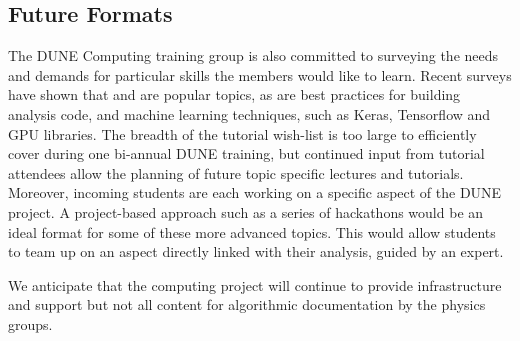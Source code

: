 \documentclass[../main-v1.tex]{subfiles}
\begin{document}
\subsection{Future Formats}
The DUNE Computing training group is also committed to surveying the needs and %
demands for particular %
skills the members would like to learn. Recent surveys have shown that  and  are popular topics, as are %
best practices for building analysis code, %
and machine learning techniques, such as Keras, Tensorflow and GPU libraries.  The breadth of the tutorial wish-list is too large to efficiently cover during one bi-annual DUNE training, but continued input from tutorial attendees allow the planning of future topic specific lectures and tutorials. Moreover, incoming students are each working 
on a specific aspect of the DUNE project. A 
 project-based approach such as a series of hackathons would be an ideal format for some of these more advanced topics. This would allow students to team up on an aspect 
 directly linked with their analysis, guided by an expert.

We anticipate that the computing project will continue to  provide infrastructure and support but not all content for algorithmic documentation by the physics groups.  %




\end{document}
